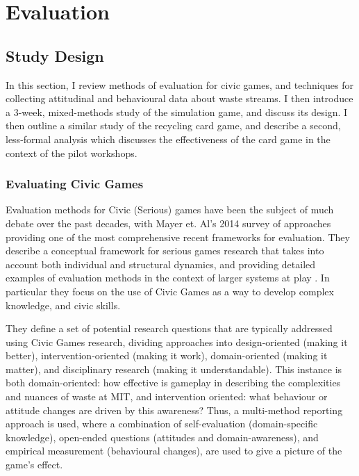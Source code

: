 \documentclass[nofonts,nols,justified,nobib]{tufte-book}
\begin{document}
\chapter{Evaluation}

\section*{Study Design}

In this section, I review methods of evaluation for civic games, and techniques for collecting attitudinal and behavioural data about waste streams. I then introduce a 3-week, mixed-methods study of the simulation game, and discuss its design. I then outline a similar study of the recycling card game, and describe a second, less-formal analysis which discusses the effectiveness of the card game in the context of the pilot workshops. %

\subsection*{Evaluating Civic Games}

Evaluation methods for Civic (Serious) games have been the subject of much debate over the past decades, with Mayer et. Al's 2014 survey of approaches providing one of the most comprehensive recent frameworks for evaluation. They describe a conceptual framework for serious games research that takes into account both individual and structural dynamics, and providing detailed examples of evaluation methods in the context of larger systems at play \cite{mayer_research_2014}. In particular they focus on the use of Civic Games as a way to develop complex knowledge, and civic skills.


They define a set of potential research questions that are typically addressed using Civic Games research, dividing approaches into design-oriented (making it better), intervention-oriented (making it work), domain-oriented (making it matter), and disciplinary research (making it understandable). This instance is both domain-oriented: how effective is gameplay in describing the complexities and nuances of waste at MIT, and intervention oriented: what behaviour or attitude changes are driven by this awareness? Thus, a multi-method reporting approach is used, where a combination of self-evaluation (domain-specific knowledge), open-ended questions (attitudes and domain-awareness), and empirical measurement (behavioural changes), are used to give a picture of the game's effect.
\end{document}

